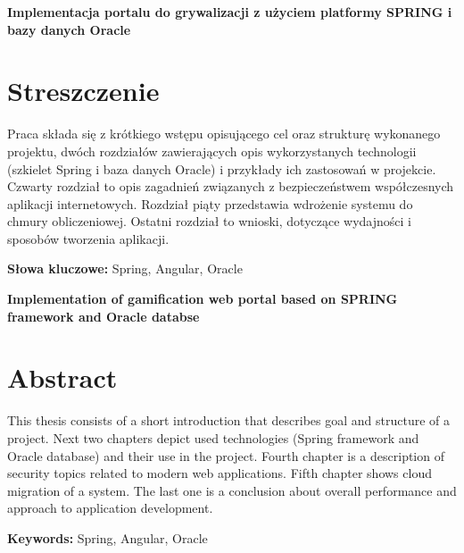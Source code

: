 \newpage
\begin{center}
\large \bf
Implementacja portalu do grywalizacji z użyciem platformy SPRING i bazy danych Oracle
\end{center}

\section*{Streszczenie}
Praca składa się z krótkiego wstępu opisującego cel oraz strukturę wykonanego projektu, dwóch rozdziałów
zawierających opis wykorzystanych technologii (szkielet Spring i baza danych Oracle) i przykłady ich zastosowań w projekcie. Czwarty rozdział to opis zagadnień związanych z bezpieczeństwem współczesnych aplikacji internetowych. Rozdział piąty przedstawia wdrożenie systemu do chmury obliczeniowej. Ostatni rozdział to wnioski, dotyczące wydajności i sposobów tworzenia aplikacji.

\bigskip
{\noindent\bf Słowa kluczowe:} Spring, Angular, Oracle

\vskip 2cm


\begin{center}
\large \bf
Implementation of gamification web portal based on SPRING framework and Oracle databse
\end{center}

\section*{Abstract}
This thesis consists of a short introduction that describes goal and structure of a project. Next two chapters depict used technologies (Spring framework and Oracle database) and their use in the project. Fourth chapter is a description of security topics related to modern web applications. Fifth chapter shows cloud migration of a system. The last one is a conclusion about overall performance and approach to application development.

\bigskip
{\noindent\bf Keywords:} Spring, Angular, Oracle

\vfill